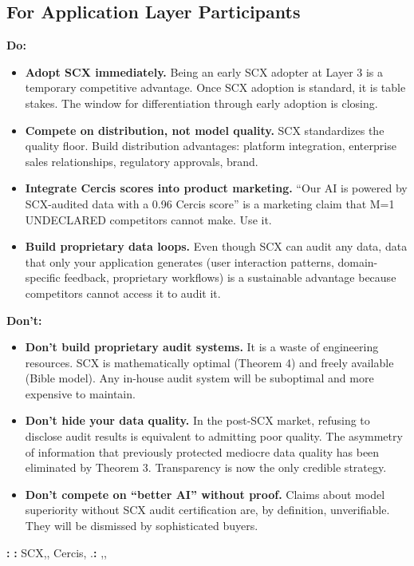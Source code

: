 \documentclass[12pt,a4paper]{article}
\theoremstyle{remark}
\begin{document}
\subsection{For Application Layer Participants}
\textbf{Do:}
\begin{itemize}
 \item \textbf{Adopt SCX immediately.} Being an early SCX adopter at Layer 3 is a 
 temporary competitive advantage. Once SCX adoption is standard, it is 
 table stakes. The window for differentiation through early adoption is 
 closing.
 \item \textbf{Compete on distribution, not model quality.} SCX standardizes the 
 quality floor. Build distribution advantages: platform integration, 
 enterprise sales relationships, regulatory approvals, brand.
 \item \textbf{Integrate Cercis scores into product marketing.} ``Our AI is 
 powered by SCX-audited data with a 0.96 Cercis score'' is a marketing 
 claim that M=1 UNDECLARED competitors cannot make. Use it.
 \item \textbf{Build proprietary data loops.} Even though SCX can audit any data, 
 data that only your application generates (user interaction patterns, 
 domain-specific feedback, proprietary workflows) is a sustainable 
 advantage because competitors cannot access it to audit it.
\end{itemize}
\textbf{Don't:}
\begin{itemize}
 \item \textbf{Don't build proprietary audit systems.} It is a waste of engineering 
 resources. SCX is mathematically optimal (Theorem 4) and freely available 
 (Bible model). Any in-house audit system will be suboptimal and more 
 expensive to maintain.
 \item \textbf{Don't hide your data quality.} In the post-SCX market, refusing to 
 disclose audit results is equivalent to admitting poor quality. The 
 asymmetry of information that previously protected mediocre data quality 
 has been eliminated by Theorem 3. Transparency is now the only credible 
 strategy.
 \item \textbf{Don't compete on ``better AI'' without proof.} Claims about model 
 superiority without SCX audit certification are, by definition, 
 unverifiable. They will be dismissed by sophisticated buyers.
\end{itemize}
\noindent\textbf{: }
\textbf{: }SCX,, Cercis, 
.\textbf{: },, 
\end{document}
